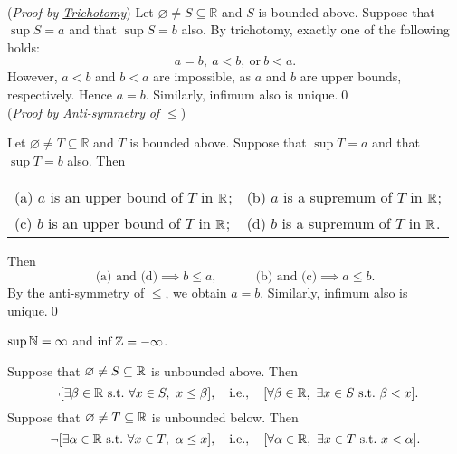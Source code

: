 \documentclass[11pt,openany]{article}
\begin{document}
\begin{remark*}
	\ \vspace{12pt} \\
	(\textit{Proof by \hyperlink{trichotomy}{Trichotomy}}) Let $\varnothing\neq S\subseteq\mathbb{R}$ and $S$ is bounded above. Suppose that $\sup S=a$ and that $\sup S=b$ also. By trichotomy, exactly one of the following holds: \[
	a=b,\ a<b,\ \text{or}\ b<a.  
	\] However, $a<b$ and $b<a$ are impossible, as $a$ and $b$ are upper bounds, respectively. Hence $a=b$. Similarly, infimum also is unique.\qed\vspace{12pt} \\
	(\textit{Proof by Anti-symmetry}\footnotemark[3]\textit{ of $\leq$})
	\addtocounter{footnote}{1}
	Let $\varnothing\neq T\subseteq\mathbb{R}$ and $T$ is bounded above. Suppose that $\sup T=a$ and that $\sup T=b$ also. Then \begin{center}
		\begin{tabular*}{\textwidth}{ll}
			(a) $a$ is an upper bound of $T$ in $\mathbb{R}$;
			& (b) $a$ is a supremum of $T$ in $\mathbb{R}$; \\
			(c) $b$ is an upper bound of $T$ in $\mathbb{R}$;
			& (d) $b$ is a supremum of $T$ in $\mathbb{R}$.
		\end{tabular*}
	\end{center} Then \[
	\text{(a) and (d)} \implies b\leq a,\quad\quad\quad\text{(b) and (c)} \implies a\leq b.
	\] By the anti-symmetry of $\leq$, we obtain $a=b$. Similarly, infimum also is unique.\qed
\end{remark*}
\vfill
{}
\begin{example*}
	$\sup \mathbb{N}=\infty$ and $\inf\mathbb{Z}=-\infty$.
\end{example*}
\begin{remark*}
	Suppose that $\varnothing\neq S\subseteq\mathbb{R}$ is unbounded above. Then \[
	\lnot[\exists\beta\in\mathbb{R}\ \text{s.t.}\ \forall x\in S,\ x\leq\beta],\quad \textnormal{i.e.},\quad [\forall\beta\in\mathbb{R},\ \exists x\in S\ \text{s.t.}\ \beta <x].
	\] Suppose that $\varnothing\neq T\subseteq\mathbb{R}$ is unbounded below. Then \[
	\lnot[\exists\alpha\in\R\ \text{s.t.}\ \forall x\in T,\ \alpha\leq x],\quad \ie,\quad [\forall\alpha\in\R,\ \exists x\in T\ \text{s.t.}\ x < \alpha].
	\]
\end{remark*}
\end{document}
